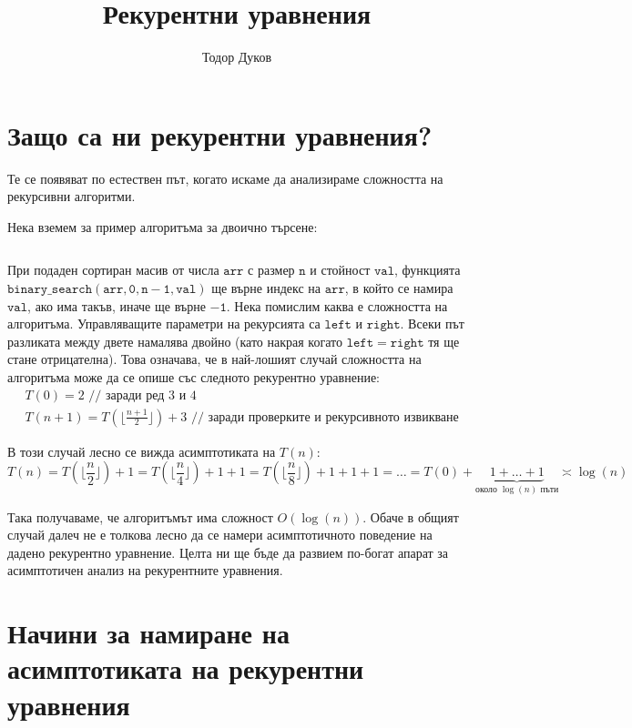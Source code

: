 \documentclass{article}
\title{Рекурентни уравнения}
\author{Тодор Дуков}
\date{}
\theoremstyle{definition}
\theoremstyle{plain}
\theoremstyle{remark}
\theoremstyle{definition}
\begin{document}
\maketitle

\section*{Защо са ни рекурентни уравнения?}

Те се появяват по естествен път, когато искаме да анализираме сложността на рекурсивни алгоритми.

Нека вземем за пример алгоритъма за двоично търсене:
\inputminted[linenos]{c++}{algorithms/binary_search.cpp}

При подаден сортиран масив от числа $\mathtt{arr}$ с размер $\mathtt{n}$ и стойност $\mathtt{val}$, функцията $\mathtt{binary\_search(arr, 0, n - 1, val)}$ ще върне индекс на $\mathtt{arr}$, в който се намира $\mathtt{val}$, ако има такъв, иначе ще върне $\mathtt{-1}$.
Нека помислим каква е сложността на алгоритъма.
Управляващите параметри на рекурсията са $\mathtt{left}$ и $\mathtt{right}$.
Всеки път разликата между двете намалява двойно (като накрая когато $\mathtt{left = right}$ тя ще стане отрицателна).
Това означава, че в най-лошият случай сложността на алгоритъма може да се опише със следното рекурентно уравнение:
\begin{align*}
     & T(0) = 2 \text{ // заради ред } 3 \text{ и } 4                                                          \\
     & T(n + 1) = T(\lfloor \frac{n + 1}{2} \rfloor) + 3 \text{ // заради проверките и рекурсивното извикване}
\end{align*}

В този случай лесно се вижда асимптотиката на $T(n)$:
\[
    T(n) = T(\lfloor \frac{n}{2} \rfloor) + 1 = T(\lfloor \frac{n}{4} \rfloor) + 1 + 1 = T(\lfloor \frac{n}{8} \rfloor) + 1 + 1 + 1 = \dots = T(0) + \underbrace{1 + \dots + 1}_{\text{около } \log(n) \text{ пъти}} \asymp \log(n)
\]

Така получаваме, че алгоритъмът има сложност $O(\log(n))$.
Обаче в общият случай далеч не е толкова лесно да се намери асимптотичното поведение на дадено рекурентно уравнение.
Целта ни ще бъде да развием по-богат апарат за асимптотичен анализ на рекурентните уравнения.

\section*{Начини за намиране на асимптотиката на рекурентни уравнения}
\end{document}

